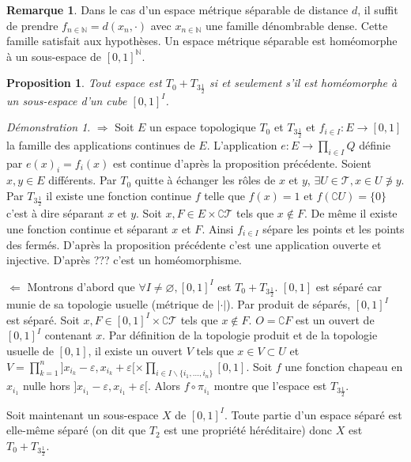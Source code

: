 \documentclass[a4paper, 11pt, french]{book}
\newenvironment{itemise}{\itemize}{\enditemize}
\theoremstyle{plain} %
\newtheorem{proposition}{Proposition}
\theoremstyle{definition} %
\newtheorem{remarque}{Remarque}
\theoremstyle{remark} %
\newtheorem*{demonstration}{Démonstration}
\renewcommand{\setminus}{\backslash}
\newcommand{\1}{\mathds{1}}
\newcommand\vide{\varnothing}
\newcommand{\N}{\mathbb{N}}
\begin{document}
\begin{remarque}
	Dans le cas d'un espace métrique séparable de distance $d$, il suffit de prendre $f_{n\in\N}=d(x_n, \cdot)$ avec $x_{n\in\N}$ une famille dénombrable dense.
	Cette famille satisfait aux hypothèses.
	Un espace métrique séparable est homéomorphe à un sous-espace de $[0, 1]^\N$.
\end{remarque}

\begin{proposition}
	Tout espace est $T_0+T_{3\frac{1}{2}}$ si et seulement s'il est homéomorphe à un sous-espace d'un cube $[0, 1]^I$.
\end{proposition}

\begin{demonstration}
	\begin{itemise}
		\item[$\Rightarrow$] Soit $E$ un espace topologique $T_0$ et $T_{3\frac{1}{2}}$ et $f_{i\in I}:E\rightarrow [0, 1]$ la famille des applications continues de $E$.
		L'application $e:E\rightarrow \prod_{i\in I}Q$ définie par $e(x)_i=f_i(x)$ est continue d'après la proposition précédente.
		Soient $x, y\in E$ différents.
		Par $T_0$ quitte à échanger les rôles de $x$ et $y$, $\exists U\in\mathscr{T}, x\in U\not\ni y$.
		Par $T_{3\frac{1}{2}}$ il existe une fonction continue $f$ telle que $f(x)=1$ et $f(\complement U)=\{0\}$ c'est à dire séparant $x$ et $y$.
		Soit $x, F\in E\times\complement\mathscr{T}$ tels que $x\notin F$.
		De même il existe une fonction continue et séparant $x$ et $F$.
		Ainsi $f_{i\in I}$ sépare les points et les points des fermés.
		D'après la proposition précédente c'est une application ouverte et injective.
		D'après {\color{red} ???} c'est un homéomorphisme.
		\item[$\Leftarrow$] Montrons d'abord que $\forall I\neq\vide, [0, 1]^I$ est $T_0+T_{3\frac{1}{2}}$.
		$[0, 1]$ est séparé car munie de sa topologie usuelle (métrique de $|\cdot|$).
		Par produit de séparés, $[0, 1]^I$ est séparé.
		Soit $x, F\in[0, 1]^I\times\complement\mathscr{T}$ tels que $x\notin F$.
		$O=\complement F$ est un ouvert de $[0, 1]^I$ contenant $x$.
		Par définition de la topologie produit et de la topologie usuelle de $[0, 1]$, il existe un ouvert $V$ tels que $x\in V\subset U$ et $V=\prod_{k=1}^n]x_{i_k}-\varepsilon, x_{i_k}+\varepsilon[\times\prod_{i\in I\setminus\{i_1, ..., i_n\}}[0, 1]$.
					Soit $f$ une fonction chapeau en $x_{i_1}$ nulle hors $]x_{i_1}-\varepsilon, x_{i_1}+\varepsilon[$.
		Alors $f\circ\pi_{i_1}$ montre que l'espace est $T_{3\frac{1}{2}}$.

		Soit maintenant un sous-espace $X$ de $[0, 1]^I$.
		Toute partie d'un espace séparé est elle-même séparé (on dit que $T_2$ est une propriété héréditaire) donc $X$ est $T_0+T_{3\frac{1}{2}}$.
	\end{itemise}
\end{demonstration}
\end{document}
